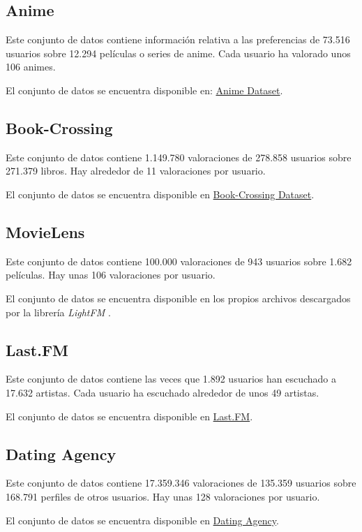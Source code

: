 \subsection{Anime}\label{anime}
Este conjunto de datos \cite{CopperUnion2017} contiene información relativa a las preferencias de 73.516 usuarios sobre 12.294 películas o series de anime. Cada usuario ha valorado unos 106 animes.

El conjunto de datos se encuentra disponible en: \href{https://www.kaggle.com/CooperUnion/anime-recommendations-database/downloads/anime-recommendations-database.zip/1}{Anime Dataset}.

\subsection{Book-Crossing}\label{book-crossing}
Este conjunto de datos \cite{Ziegler2004} contiene 1.149.780 valoraciones de 278.858 usuarios sobre 271.379 libros. Hay alrededor de 11 valoraciones por usuario.

El conjunto de datos se encuentra disponible en \href{http://www2.informatik.uni-freiburg.de/~cziegler/BX/BX-CSV-Dump.zip}{Book-Crossing Dataset}.

\subsection{MovieLens}\label{movielens}
Este conjunto de datos \cite{GroupLens1998} contiene 100.000 valoraciones de 943 usuarios sobre 1.682 películas. Hay unas 106 valoraciones por usuario.

El conjunto de datos se encuentra disponible en los propios archivos descargados por la librería \textit{LightFM} \cite{DBLP:conf/recsys/Kula15}.

\subsection{Last.FM}\label{last.fm}
Este conjunto de datos \cite{Cantador:RecSys2011} contiene las veces que 1.892 usuarios han escuchado a 17.632 artistas. Cada usuario ha escuchado alrededor de unos 49 artistas.

El conjunto de datos se encuentra disponible en \href{http://files.grouplens.org/datasets/hetrec2011/hetrec2011-lastfm-2k.zip}{Last.FM}.

\subsection{Dating Agency}\label{dating-agency}
Este conjunto de datos \cite{brozovsky07recommender} contiene 17.359.346 valoraciones de 135.359 usuarios sobre 168.791 perfiles de otros usuarios. Hay unas 128 valoraciones por usuario.

El conjunto de datos se encuentra disponible en \href{http://www.occamslab.com/petricek/data/libimseti-complete.zip}{Dating Agency}.



